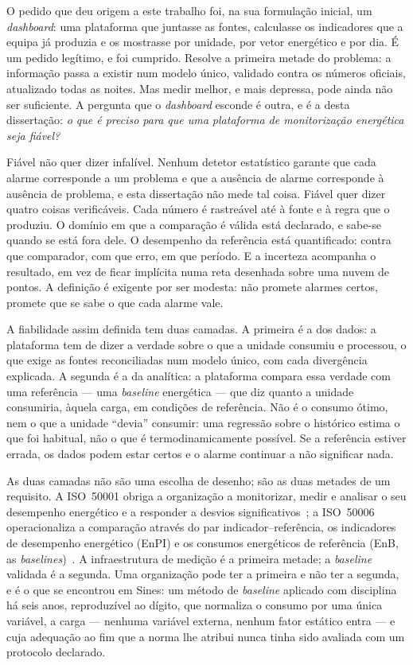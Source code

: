 O pedido que deu origem a este trabalho foi, na sua formulação inicial,
um \emph{dashboard}: uma plataforma que juntasse as fontes, calculasse
os indicadores que a equipa já produzia e os mostrasse por unidade, por
vetor energético e por dia. É um pedido legítimo, e foi cumprido. Resolve
a primeira metade do problema: a informação passa a existir num modelo
único, validado contra os números oficiais, atualizado todas as noites.
Mas medir melhor, e mais depressa, pode ainda não ser suficiente. A pergunta que o
\emph{dashboard} esconde é outra, e é a desta dissertação: \emph{o que é
preciso para que uma plataforma de monitorização energética seja
fiável?}

Fiável não quer dizer infalível. Nenhum detetor estatístico garante que
cada alarme corresponde a um problema e que a ausência de alarme
corresponde à ausência de problema, e esta dissertação não mede tal
coisa. Fiável quer dizer quatro coisas verificáveis. Cada número é
rastreável até à fonte e à regra que o produziu. O domínio em que a
comparação é válida está declarado, e sabe-se quando se está fora dele. O
desempenho da referência está quantificado: contra que comparador, com
que erro, em que período. E a incerteza acompanha o resultado, em vez de
ficar implícita numa reta desenhada sobre uma nuvem de pontos. A
definição é exigente por ser modesta: não promete alarmes certos, promete
que se sabe o que cada alarme vale.

A fiabilidade assim definida tem duas camadas. A primeira é a dos dados: a plataforma tem de dizer a
verdade sobre o que a unidade consumiu e processou, o que exige as fontes
reconciliadas num modelo único, com cada divergência explicada. A segunda
é a da analítica: a plataforma compara essa verdade com uma referência
--- uma \emph{baseline} energética --- que diz quanto a unidade
consumiria, àquela carga, em condições de referência. Não é o consumo
ótimo, nem o que a unidade \enquote{devia} consumir: uma regressão sobre
o histórico estima o que foi habitual, não o que é termodinamicamente
possível. Se a referência estiver errada, os dados podem estar certos e o
alarme continuar a não significar nada.

As duas camadas não são uma escolha de desenho; são as duas metades de
um requisito. A ISO~50001 obriga a organização a monitorizar, medir e
analisar o seu desempenho energético e a responder a desvios
significativos~\cite[\S9.1]{ISO50001_2018}; a ISO~50006 operacionaliza a
comparação através do par indicador--referência, os indicadores de
desempenho energético (EnPI) e os consumos energéticos de referência
(EnB, as \emph{baselines})~\cite{ISO50006_2014}. A infraestrutura de
medição é a primeira metade; a \emph{baseline} validada é a segunda. Uma
organização pode ter a primeira e não ter a segunda, e é o que se
encontrou em Sines: um método de \emph{baseline} aplicado com disciplina
há seis anos, reproduzível ao dígito, que normaliza o consumo por uma
única variável, a carga --- nenhuma variável externa, nenhum fator
estático entra --- e cuja adequação ao fim que a norma lhe atribui nunca
tinha sido avaliada com um protocolo declarado.

